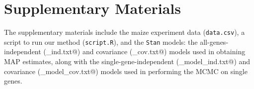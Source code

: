\documentclass[useAMS,usenatbib,referee]{biom}
\begin{document}

\section*{Supplementary Materials}

The supplementary materials include the maize experiment data ({\tt data.csv}), a script to run our method ({\tt script.R}), and the {\tt Stan} models: the all-genes-independent (\verb@model_ind.txt@) and covariance (\verb@model_cov.txt@) models used in obtaining MAP estimates, along with the single-gene-independent (\verb@sg_model_ind.txt@) and covariance (\verb@sg_model_cov.txt@) models used in performing the MCMC on single genes. 






\label{lastpage}
\end{document}
